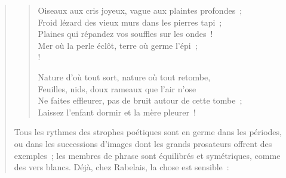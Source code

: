 \documentclass[french,twoside]{book} %
\begin{document}
\begin{verse}
\begin{verse}
Oiseaux aux cris joyeux, vague aux plaintes profondes ;\\
Froid lézard des vieux murs dans les pierres tapi ;\\
Plaines qui répandez vos souffles sur les ondes !\\
Mer où la perle éclôt, terre où germe l’épi ;\\!

Nature d’où tout sort, nature où tout retombe,\\
Feuilles, nids, doux rameaux que l’air n’ose\\
Ne faites effleurer, pas de bruit autour de cette tombe ;\\
Laissez l’enfant dormir et la mère pleurer !\\
\end{verse}

\noindent Tous les rythmes des strophes poétiques sont en germe dans les périodes, ou dans les successions d’images dont les grands prosateurs offrent des exemples ; les membres de phrase sont équilibrés et symétriques, comme des vers blancs. Déjà, chez Rabelais, la chose est sensible :\par



\end{verse}
\end{document}
